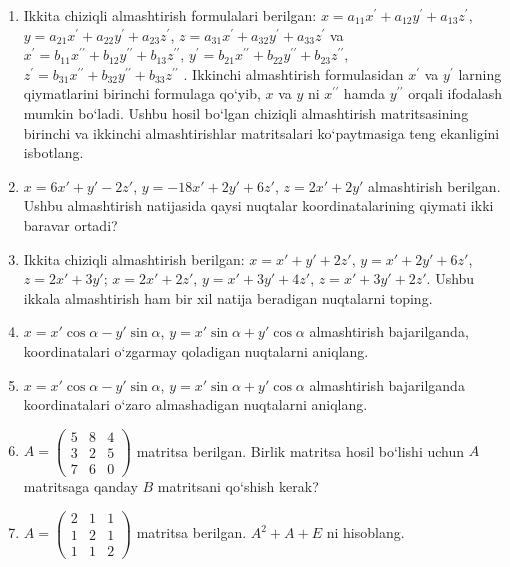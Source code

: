 \begin{enumerate}
\item Ikkita chiziqli almashtirish formulalari berilgan: $x=a_{11}x^\prime+a_{12}y^\prime+a_{13}z^\prime$, $y=a_{21}x^\prime+a_{22}y^\prime+a_{23}z^\prime$,
$z=a_{31}x^\prime+a_{32}y^\prime+a_{33}z^\prime$
va 
$x^\prime=b_{11}x^{\prime\prime}+b_{12}y^{\prime\prime}+b_{13}z^{\prime\prime}$,
$y^\prime=b_{21}x^{\prime\prime}+b_{22}y^{\prime\prime}+b_{23}z^{\prime\prime}$,
$z^\prime=b_{31}x^{\prime\prime}+b_{32}y^{\prime\prime}+b_{33}z^{\prime\prime}$
. Ikkinchi almashtirish formulasidan $x^\prime$ va $y^\prime$ larning qiymatlarini birinchi formulaga qo`yib, $x$ va $y$ ni $x^{\prime\prime}$ hamda $y^{\prime\prime}$ orqali ifodalash mumkin bo`ladi. Ushbu hosil bo`lgan chiziqli almashtirish matritsasining birinchi va ikkinchi almashtirishlar matritsalari ko`paytmasiga teng ekanligini isbotlang.

\item $x=6x'+y'-2z'$, $y=-18x'+2y'+6z'$, $z=2x'+2y'$ almashtirish berilgan. Ushbu almashtirish natijasida qaysi nuqtalar koordinatalarining qiymati ikki baravar ortadi?

\item Ikkita chiziqli almashtirish berilgan: $x=x'+y'+2z'$, $y=x'+2y'+6z'$, $z=2x'+3y'$; $x=2x'+2z'$, $y=x'+3y'+4z'$, $z=x'+3y'+2z'$. Ushbu ikkala almashtirish ham bir xil natija beradigan nuqtalarni toping.

\item $x=x'\cos\alpha-y'\sin\alpha$, $y=x'\sin\alpha+y'\cos\alpha$ almashtirish bajarilganda, koordinatalari o`zgarmay qoladigan nuqtalarni aniqlang.

\item $x=x'\cos\alpha-y'\sin\alpha$, $y=x'\sin\alpha+y'\cos\alpha$ almashtirish bajarilganda koordinatalari o`zaro almashadigan nuqtalarni aniqlang.

\item $A=\begin{pmatrix}
	5&8&4\\3&2&5\\7&6&0
\end{pmatrix}$ matritsa berilgan. Birlik matritsa hosil bo`lishi uchun $A$ matritsaga qanday $B$ matritsani qo`shish kerak?

\item $A=\begin{pmatrix}
	2&1&1\\1&2&1\\1&1&2
\end{pmatrix}$ matritsa berilgan. $A^2+A+E$ ni hisoblang.


\end{enumerate}

